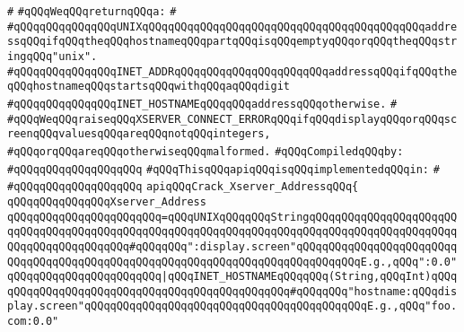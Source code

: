 \verb|#|\newline
\verb|#qQQqWeqQQqreturnqQQqa:|\newline
\verb|#|\newline
\verb|#qQQqqQQqqQQqqQQqUNIXqQQqqQQqqQQqqQQqqQQqqQQqqQQqqQQqqQQqqQQqqQQqaddressqQQqifqQQqtheqQQqhostnameqQQqpartqQQqisqQQqemptyqQQqorqQQqtheqQQqstringqQQq"unix".|\newline
\verb|#qQQqqQQqqQQqqQQqINET_ADDRqQQqqQQqqQQqqQQqqQQqqQQqaddressqQQqifqQQqtheqQQqhostnameqQQqstartsqQQqwithqQQqaqQQqdigit|\newline
\verb|#qQQqqQQqqQQqqQQqINET_HOSTNAMEqQQqqQQqaddressqQQqotherwise.|\newline
\verb|#|\newline
\verb|#qQQqWeqQQqraiseqQQqXSERVER_CONNECT_ERRORqQQqifqQQqdisplayqQQqorqQQqscreenqQQqvaluesqQQqareqQQqnotqQQqintegers,|\newline
\verb|#qQQqorqQQqareqQQqotherwiseqQQqmalformed.|\newline
\newline
\verb|#qQQqCompiledqQQqby:|\newline
\verb|#qQQqqQQqqQQqqQQqqQQq|\newline
\newline
\verb|#qQQqThisqQQqapiqQQqisqQQqimplementedqQQqin:|\newline
\verb|#|\newline
\verb|#qQQqqQQqqQQqqQQqqQQq|\newline
\newline
\verb|apiqQQqCrack_Xserver_AddressqQQq{|\newline
\newline
\verb|qQQqqQQqqQQqqQQqXserver_Address|\newline
\verb|qQQqqQQqqQQqqQQqqQQqqQQq=qQQqUNIXqQQqqQQqStringqQQqqQQqqQQqqQQqqQQqqQQqqQQqqQQqqQQqqQQqqQQqqQQqqQQqqQQqqQQqqQQqqQQqqQQqqQQqqQQqqQQqqQQqqQQqqQQqqQQqqQQqqQQqqQQq#qQQqqQQq":display.screen"qQQqqQQqqQQqqQQqqQQqqQQqqQQqqQQqqQQqqQQqqQQqqQQqqQQqqQQqqQQqqQQqqQQqqQQqqQQqqQQqE.g.,qQQq":0.0"|\newline
\verb|qQQqqQQqqQQqqQQqqQQqqQQq|\verb#|qQQqINET_HOSTNAMEqQQqqQQq(String,qQQqInt)qQQqqQQqqQQqqQQqqQQqqQQqqQQqqQQqqQQqqQQqqQQqqQQq#\verb|#qQQqqQQq"hostname:qQQqdisplay.screen"qQQqqQQqqQQqqQQqqQQqqQQqqQQqqQQqqQQqqQQqqQQqE.g.,qQQq"foo.com:0.0"|\newline
